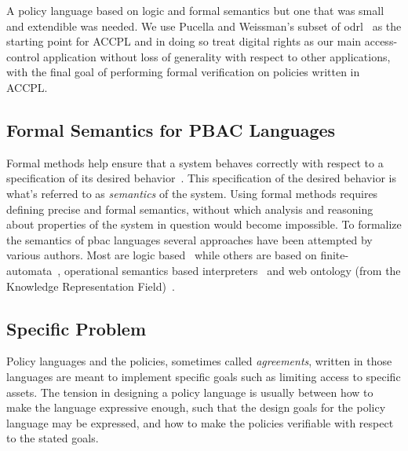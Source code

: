 \documentclass[runningheads,a4paper]{llncs}
\begin{document}
A policy language based on logic and formal semantics but one that was small and extendible was needed. We use Pucella and Weissman's subset of \ac{odrl}~\cite{pucella2006} as the starting point for \ac{ACCPL} and in doing so treat digital rights as our main access-control application without loss of generality with respect to other applications, with the final goal of performing formal verification on policies written in \ac{ACCPL}.



\subsection{Formal Semantics for PBAC Languages}


Formal methods help ensure that a system behaves correctly with respect to a specification of its desired behavior~\cite{TAPL}. This specification of the desired behavior is what's referred to as \emph{semantics} of the system. Using formal methods requires defining precise and formal semantics, without which analysis and reasoning about properties of the system in question would become impossible. To formalize the semantics of \ac{pbac} languages several approaches have been attempted by various authors. Most are logic based~\cite{Halpern2008,pucella2006} while others are based on finite-automata~\cite{Holzer}, operational semantics based interpreters~\cite{Safavi-naini} and web ontology (from the Knowledge Representation Field)~\cite{Kasten2010MTS}. 




\subsection{Specific Problem}

Policy languages and the policies, sometimes called \emph{agreements}, written in those languages are meant to implement specific goals such as limiting access to specific assets. The tension in designing a policy language is usually between how to make the language expressive enough, such that the design goals for the policy language may be expressed, and how to make the policies verifiable with respect to the stated goals.
\end{document}
